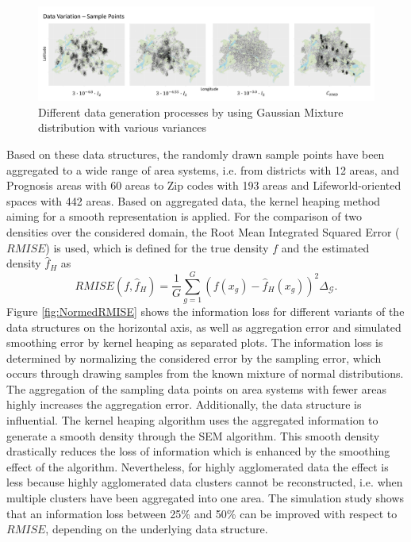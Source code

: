 \begin{figure}[ht]
    \centering
    \includegraphics[scale = 0.42]{Figure/Setting_Variation2.png}
    \caption{Different data generation processes by using Gaussian Mixture distribution with various variances}
    \label{fig:setting_variation}
\end{figure}

Based on these data structures, the randomly drawn sample points have been aggregated to a wide range of area systems, i.e. from districts with 12 areas,
and Prognosis areas with 60 areas to Zip codes with 193 areas and Lifeworld-oriented spaces with 442 areas.
Based on aggregated data, the kernel heaping method aiming for a smooth representation is applied. 
For the comparison of two densities over the considered domain, the Root Mean Integrated Squared Error ($RMISE$) is used, which is defined for the true density $f$ and the estimated density $\hat{f}_H$ as  
$$ RMISE(f, \hat{f}_H) = \frac{1}{G} \sum_{g = 1}^G (f(x_g) - \hat{f}_H(x_g))^2 \Delta_\mathcal{G}. $$
Figure \ref{fig:NormedRMISE} shows the information loss for different variants of the data structures on the horizontal axis, as well as aggregation error and simulated smoothing error by kernel heaping as separated plots.
The information loss is determined by normalizing the considered error by the sampling error, which occurs through drawing samples from the known mixture of normal distributions. The aggregation of the sampling data points on area systems with fewer areas highly increases the aggregation error. Additionally, the data structure is influential. The kernel heaping algorithm uses the aggregated information to generate a smooth density through the SEM algorithm. This smooth density drastically reduces the loss of information which is enhanced by the smoothing effect of the algorithm. Nevertheless, for highly agglomerated data the effect is less because highly agglomerated data clusters cannot be reconstructed, i.e. when multiple clusters have been aggregated into one area. 
The simulation study shows that an information loss between 25\% and 50\% can be improved with respect to $RMISE$, depending on the underlying data structure. 

